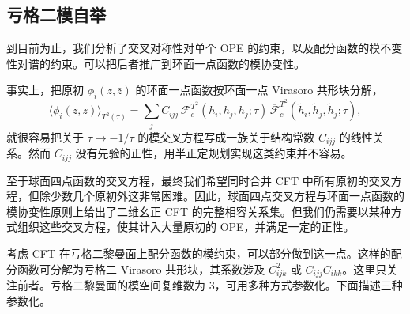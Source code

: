 

\subsection{亏格二模自举}\label{sec:5-4}

到目前为止，我们分析了交叉对称性对单个 OPE 的约束，以及配分函数的模不变性对谱的约束。可以把后者推广到环面一点函数的模协变性。


事实上，把原初 $\phi_i(z,\bar z)$ 的环面一点函数按环面一点 Virasoro 共形块分解，
\begin{equation}
  \label{eq:5-33}
  \bigl\langle \phi_i(z,\bar z)\bigr\rangle_{T^2(\tau)}
  = \sum_j C_{ijj}\,
    \mathcal{F}_c^{T^2}(h_i,h_j,h_j;\tau)\,
    \overline{\mathcal{F}}_c^{T^2}
      (\tilde h_i,\tilde h_j,\tilde h_j;\bar\tau),
\end{equation}
就很容易把关于 $\tau\to-1/\tau$ 的模交叉方程写成一族关于结构常数 $C_{ijj}$ 的线性关系。然而 $C_{ijj}$ 没有先验的正性，用半正定规划实现这类约束并不容易。

至于球面四点函数的交叉方程，最终我们希望同时合并 CFT 中所有原初的交叉方程，但除少数几个原初外这非常困难。因此，球面四点交叉方程与环面一点函数的模协变性原则上给出了二维幺正 CFT 的完整相容关系集。但我们仍需要以某种方式组织这些交叉方程，使其计入大量原初的 OPE，并满足一定的正性。

考虑 CFT 在亏格二黎曼面上配分函数的模约束，可以部分做到这一点。这样的配分函数可分解为亏格二 Virasoro 共形块，其系数涉及 $C_{ijk}^2$ 或 $C_{ijj}C_{ikk}$。这里只关注前者。亏格二黎曼面的模空间复维数为 $3$，可用多种方式参数化。下面描述三种参数化。


